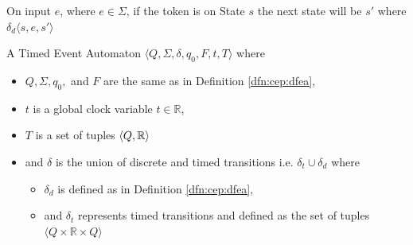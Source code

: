 			
			On input $e$, where $e \in \Sigma$, if the token is on State $s$ the next state will be $s'$ where 
			$\delta_d \langle s,e,s' \rangle$ 
			
			
			
			\begin{dfn}
				\label{dfn:cep:TEA}
				A Timed Event Automaton $\langle Q,\Sigma,\delta,q_0, F, t, T \rangle$ where
				\begin{itemize}
					\item $Q, \Sigma, q_0,$ and $F$ are the same as in Definition \ref{dfn:cep:dfea},
					\item $t$ is a global clock variable $t \in \mathbb{R}$,
					\item $T$ is a set of tuples $\langle Q, \mathbb{R} \rangle$
					\item and $\delta$ is the union of discrete and timed transitions i.e. $\delta_t \cup \delta_d$ where
					\begin{itemize}
						\item $\delta_d$ is defined as in Definition \ref{dfn:cep:dfea},
						\item and $\delta_t$ represents timed transitions and defined as the set of tuples $\langle Q \times \mathbb{R} \times Q \rangle$ 
					\end{itemize}
				\end{itemize}
			\end{dfn}
			
